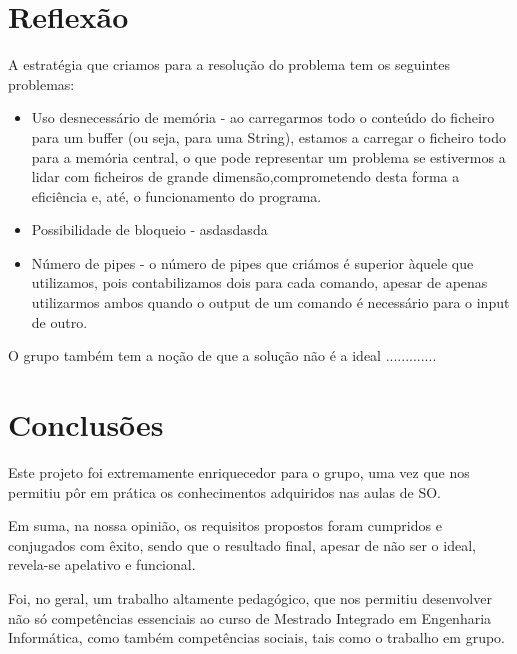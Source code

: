 \documentclass[a4paper]{article}
\begin{document}
\section{Reflexão}
\label{sec:reflexao}

A estratégia que criamos para a resolução do problema tem os seguintes problemas:

\begin{itemize}
  \item{Uso desnecessário de memória - ao carregarmos todo o conteúdo do ficheiro para um buffer (ou seja, para uma String), estamos a carregar o ficheiro todo para a memória central, o que pode representar um problema se estivermos a lidar com ficheiros de grande dimensão,comprometendo desta forma a eficiência e, até, o funcionamento do programa.}
  \item{Possibilidade de bloqueio - asdasdasda}
  \item{Número de pipes - o número de pipes que criámos é superior àquele que utilizamos, pois contabilizamos dois para cada comando, apesar de apenas utilizarmos ambos quando o output de um comando é necessário para o input de outro.}
\end{itemize}

O grupo também tem a noção de que a solução não é a ideal .............


\section{Conclusões}
\label{sec:conclusao}

Este projeto foi extremamente enriquecedor para o grupo, uma vez que nos permitiu pôr em prática os conhecimentos adquiridos nas aulas de SO.

Em suma, na nossa opinião, os requisitos propostos foram cumpridos e conjugados com êxito, sendo que o resultado final, apesar de não ser o ideal, revela-se apelativo e funcional.

Foi, no geral, um trabalho  altamente pedagógico, que nos permitiu desenvolver não só competências essenciais ao curso de Mestrado Integrado em Engenharia Informática, como também competências sociais, tais como o trabalho em grupo.
\end{document}
